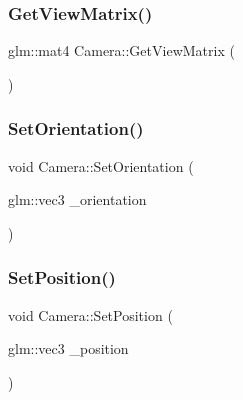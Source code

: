 \subsubsection{\texorpdfstring{Get\+View\+Matrix()}{GetViewMatrix()}}
{\footnotesize\ttfamily glm\+::mat4 Camera\+::\+Get\+View\+Matrix (\begin{DoxyParamCaption}{ }\end{DoxyParamCaption})}

\mbox{\label{class_camera_a6518b723541de76a710e337a0ee364b0}} 
\subsubsection{\texorpdfstring{Set\+Orientation()}{SetOrientation()}}
{\footnotesize\ttfamily void Camera\+::\+Set\+Orientation (\begin{DoxyParamCaption}\item[{glm\+::vec3}]{\+\_\+orientation }\end{DoxyParamCaption})\hspace{0.3cm}{\ttfamily [inline]}}

\mbox{\label{class_camera_ab2c13ba0cd3d3b08feeab6a4f7d496bc}} 
\subsubsection{\texorpdfstring{Set\+Position()}{SetPosition()}}
{\footnotesize\ttfamily void Camera\+::\+Set\+Position (\begin{DoxyParamCaption}\item[{glm\+::vec3}]{\+\_\+position }\end{DoxyParamCaption})}

